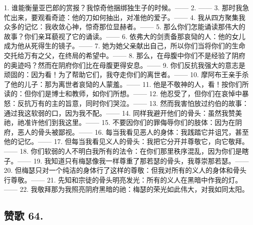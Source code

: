 1. 谁能衡量亚巴郎的赏报？我惊奇他捆绑独生子的时候。—— 2. —— 3. 那时我急忙出来，要观看奇迹：他的刀如何抽出，对准他的爱子。—— 4. 我从四方聚集我众多的记忆：我收敛心神，惊奇那位显赫者。—— 5. 那么你们怎能诵读那伟大的故事？你们亲耳藐视了它的诵读。—— 6. 依弗大的剑责备那哀恸的人：他的女儿成为他从死得生的镜子。—— 7. 她为她父亲献出自己，所以你们当将你们的生命交托给万有之父，在终局的希望中。—— 8. 那么，在母腹中你们不是经验了阴府的奥迹吗？然而在阴府你们比在母腹更得安息。—— 9. 你们反抗我强大的意志是顽固的：因为看！为了帮助它们，我夺走你们的离世者。—— 10. 摩阿布王亲手杀了他的儿子：那为离世者哀恸的人蒙羞。—— 11. 他是不敬神的人，看！按你们所读的：但你们是博士和教师，如你们所想。—— 12. 他忍受了，但你们在哀悼中暴怒：反抗万有的主的旨意，同时你们哭泣。—— 13. 然而我害怕放过约伯的故事：通过我这软弱的口，因为我不配。—— 14. 同样我避开他们的骨头：虽然我赞美祂，祂准许他们到我这里。—— 15. 不要因你们的罪侮辱你们的肢体：因为在阴府，恶人的骨头被鄙视。—— 16. 每当我看见恶人的身体：我践踏它并诅咒，甚至他的记忆。—— 17. 但每当我看见义人的骨头：我把它分开并尊敬它，向它敬拜。—— 18. 你们软弱的人不明白我所有的法令：在你们那里秩序混乱，因为你们是瞎子。—— 19. 我知道只有梅瑟像我一样尊重了那若瑟的骨头，我尊崇那若瑟。—— 20. 但梅瑟只对一个纯洁的身体行了这样的尊敬：但我对所有的义人的身体和骨头行尊敬。—— 21. 先知和宗徒的骨头明亮发光：所有的义人在黑暗中作我的灯。—— 22. 我敬拜那为我照亮阴府黑暗的祂：梅瑟的荣光如此伟大，对我如同太阳。\par


\subsection{赞歌 64.}

